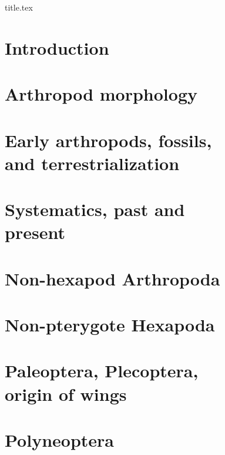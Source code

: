\documentclass[11pt]{book}
\begin{document}

\frontmatter
{title.tex}

\clearpage
\thispagestyle{empty}

\tableofcontents
\clearpage
\thispagestyle{empty}

\mainmatter

\chapter{Introduction}


\chapter{Arthropod morphology}


\chapter[Early arthropods, fossils, and terrestrialization]{Early arthropods, fossils, \\ and terrestrialization}


\chapter[Systematics, past and present]{Systematics, past and \\present}


\chapter{Non-hexapod Arthropoda}


\chapter{Non-pterygote Hexapoda}


\chapter[Paleoptera, Plecoptera, origin of wings]{Paleoptera, Plecoptera,\\ origin of wings}


\chapter{Polyneoptera}

\end{document}
